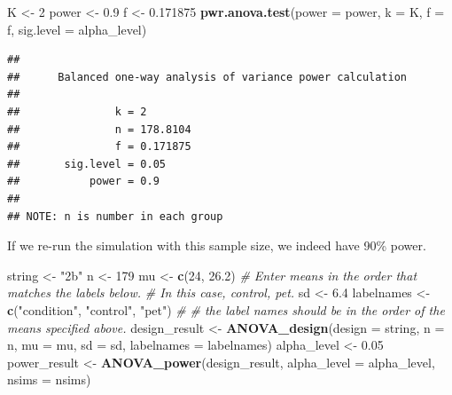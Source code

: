 \documentclass[]{book}
\newenvironment{Shaded}{\begin{snugshade}}{\end{snugshade}}
\newcommand{\CommentTok}[1]{\textcolor[rgb]{0.56,0.35,0.01}{\textit{#1}}}
\newcommand{\DataTypeTok}[1]{\textcolor[rgb]{0.13,0.29,0.53}{#1}}
\newcommand{\DecValTok}[1]{\textcolor[rgb]{0.00,0.00,0.81}{#1}}
\newcommand{\FloatTok}[1]{\textcolor[rgb]{0.00,0.00,0.81}{#1}}
\newcommand{\KeywordTok}[1]{\textcolor[rgb]{0.13,0.29,0.53}{\textbf{#1}}}
\newcommand{\NormalTok}[1]{#1}
\newcommand{\StringTok}[1]{\textcolor[rgb]{0.31,0.60,0.02}{#1}}
\begin{document}
\begin{Shaded}
\begin{Highlighting}[]
\NormalTok{K <-}\StringTok{ }\DecValTok{2}
\NormalTok{power <-}\StringTok{ }\FloatTok{0.9}
\NormalTok{f <-}\StringTok{ }\FloatTok{0.171875}
\KeywordTok{pwr.anova.test}\NormalTok{(}\DataTypeTok{power =}\NormalTok{ power,}
               \DataTypeTok{k =}\NormalTok{ K,}
               \DataTypeTok{f =}\NormalTok{ f,}
               \DataTypeTok{sig.level =}\NormalTok{ alpha_level)}
\end{Highlighting}
\end{Shaded}

\begin{verbatim}
## 
##      Balanced one-way analysis of variance power calculation 
## 
##               k = 2
##               n = 178.8104
##               f = 0.171875
##       sig.level = 0.05
##           power = 0.9
## 
## NOTE: n is number in each group
\end{verbatim}

If we re-run the simulation with this sample size, we indeed have 90\% power.

\begin{Shaded}
\begin{Highlighting}[]
\NormalTok{string <-}\StringTok{ "2b"}
\NormalTok{n <-}\StringTok{ }\DecValTok{179}
\NormalTok{mu <-}\StringTok{ }\KeywordTok{c}\NormalTok{(}\DecValTok{24}\NormalTok{, }\FloatTok{26.2}\NormalTok{)}
\CommentTok{# Enter means in the order that matches the labels below.}
\CommentTok{# In this case, control, pet. }
\NormalTok{sd <-}\StringTok{ }\FloatTok{6.4}
\NormalTok{labelnames <-}\StringTok{ }\KeywordTok{c}\NormalTok{(}\StringTok{"condition"}\NormalTok{, }\StringTok{"control"}\NormalTok{, }\StringTok{"pet"}\NormalTok{) }\CommentTok{#}
\CommentTok{# the label names should be in the order of the means specified above.}
\NormalTok{design_result <-}\StringTok{ }\KeywordTok{ANOVA_design}\NormalTok{(}\DataTypeTok{design =}\NormalTok{ string,}
                   \DataTypeTok{n =}\NormalTok{ n, }
                   \DataTypeTok{mu =}\NormalTok{ mu, }
                   \DataTypeTok{sd =}\NormalTok{ sd, }
                   \DataTypeTok{labelnames =}\NormalTok{ labelnames)}
\NormalTok{alpha_level <-}\StringTok{ }\FloatTok{0.05}
\NormalTok{power_result <-}\StringTok{ }\KeywordTok{ANOVA_power}\NormalTok{(design_result, }\DataTypeTok{alpha_level =}\NormalTok{ alpha_level, }\DataTypeTok{nsims =}\NormalTok{ nsims)}
\end{Highlighting}
\end{Shaded}
\end{document}
